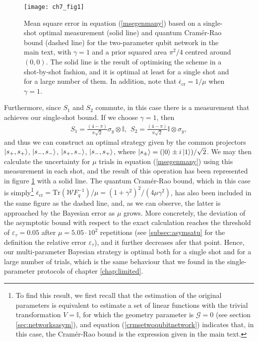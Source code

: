 \begin{figure}[t]
\centering
\texttt{[image: ch7\_fig1]}
	\caption[Shot-by-shot quantum bound for a two-parameter qubit network]{Mean square error in equation (\ref{msegenmany}) based on a single-shot optimal measurement (solid line) and quantum Cram\'{e}r-Rao bound (dashed line) for the two-parameter qubit network in the main text, with $\gamma = 1$ and a prior squared area $\pi^2/4$ centred around $(0, 0)$. The solid line is the result of optimising the scheme in a shot-by-shot fashion, and it is optimal at least for a single shot and for a large number of them. In addition, note that $\bar{\epsilon}_{\mathrm{cr}} = 1/\mu$ when $\gamma = 1$.}
\label{multibayes_plot}
\end{figure}

Furthermore, since $S_1$ and $S_2$ commute, in this case there is a measurement that achieves our single-shot bound. If we choose $\gamma = 1$, then 
\begin{eqnarray}
S_1 = \frac{ \left(4-\pi\right)}{\pi\sqrt{2}} \sigma_y\otimes\mathbb{I}, ~~S_2 = \frac{ \left(4-\pi\right)}{\pi\sqrt{2}} \mathbb{I}\otimes \sigma_y,
\label{qestloc}
\end{eqnarray}
and thus we can construct an optimal strategy given by the common projectors $\ket{s_+, s_+}$, $\ket{s_-, s_-}$, $\ket{s_+, s_-}$, $\ket{s_-, s_+}$, where $\ket{s_\pm} = (\ket{0}\pm i\ket{1})/\sqrt{2}$. We may then calculate the uncertainty for $\mu$ trials in equation (\ref{msegenmany}) using this measurement in each shot, and the result of this operation has been represented in figure \ref{multibayes_plot} with a solid line. The quantum Cram\'{e}r-Rao bound, which in this case is simply\footnote{To find this result, we first recall that the estimation of the original parameters is equivalent to estimate a set of linear functions with the trivial transformation $V=\mathbb{I}$, for which the geometry parameter is $\mathcal{G} = 0$ (see section \ref{sec:networksasym}), and equation (\ref{crmsetwoqubitnetwork}) indicates that, in this case, the Cram\'{e}r-Rao bound is the expression given in the main text.} $\bar{\epsilon}_{\mathrm{cr}}= \mathrm{Tr}(\mathcal{W} F_q^{-1})/\mu = (1+\gamma^2)^2/(4\mu\gamma^2)$, has also been included in the same figure as the dashed line, and, as we can observe, the latter is approached by the Bayesian error as $\mu$ grows. More concretely, the deviation of the asymptotic bound with respect to the exact calculation reaches the threshold of $\varepsilon_\tau = 0.05$ after $\mu = 5.05 \cdot 10^2$ repetitions (see \ref{subsec:asymsatu} for the definition the relative error $\varepsilon_\tau$), and it further decreases afer that point. Hence, our multi-parameter Bayesian strategy is optimal both for a single shot and for a large number of trials, which is the same behaviour that we found in the single-parameter protocols of chapter \ref{chap:limited}.

